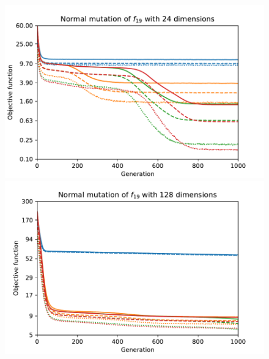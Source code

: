 \begin{figure}[ht!]
\begin{minipage}[t]{0.32\textwidth}
    \end{minipage}

    \begin{minipage}[t]{0.32\textwidth}
        \centering
        \includegraphics[width=\textwidth]{img/runs/fitness_es_mutation_f19_dim24_AddFromNormal.pdf}
    \end{minipage}
    \hfill
    \begin{minipage}[t]{0.32\textwidth}
        \centering
        \includegraphics[width=\textwidth]{img/runs/fitness_es_mutation_f19_dim128_AddFromNormal.pdf}
    \end{minipage}
    \hfill
    \begin{minipage}[t]{0.32\textwidth}
        \centering

\end{minipage}
\end{figure}
